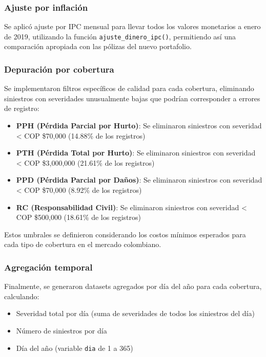 \subsubsection{Ajuste por inflación}

Se aplicó ajuste por IPC mensual para llevar todos los valores monetarios a enero de 2019, utilizando la función \texttt{ajuste\_dinero\_ipc()}, permitiendo así una comparación apropiada con las pólizas del nuevo portafolio.

\subsubsection{Depuración por cobertura}

Se implementaron filtros específicos de calidad para cada cobertura, eliminando siniestros con severidades unusualmente bajas que podrían corresponder a errores de registro:

\begin{itemize}
    \item \textbf{PPH (Pérdida Parcial por Hurto)}: Se eliminaron siniestros con severidad < COP \$70,000 (14.88\% de los registros)
    \item \textbf{PTH (Pérdida Total por Hurto)}: Se eliminaron siniestros con severidad < COP \$3,000,000 (21.61\% de los registros)
    \item \textbf{PPD (Pérdida Parcial por Daños)}: Se eliminaron siniestros con severidad < COP \$70,000 (8.92\% de los registros)
    \item \textbf{RC (Responsabilidad Civil)}: Se eliminaron siniestros con severidad < COP \$500,000 (18.61\% de los registros)
\end{itemize}

Estos umbrales se definieron considerando los costos mínimos esperados para cada tipo de cobertura en el mercado colombiano.

\subsubsection{Agregación temporal}

Finalmente, se generaron datasets agregados por día del año para cada cobertura, calculando:

\begin{itemize}
    \item Severidad total por día (suma de severidades de todos los siniestros del día)
    \item Número de siniestros por día
    \item Día del año (variable \texttt{dia} de 1 a 365)
\end{itemize}

